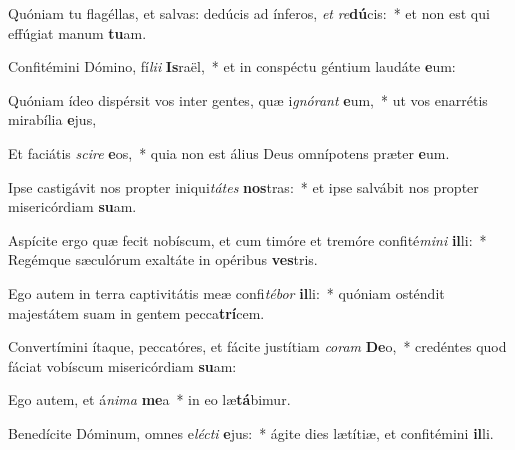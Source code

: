 \item Quóniam tu flagéllas, et salvas: dedúcis ad ínferos, \textit{et} \textit{re}\textbf{dú}cis:~* et non est qui effúgiat manum \textbf{tu}am.
\item Confitémini Dómino, fí\textit{li}\textit{i} \textbf{Is}raël,~* et in conspéctu géntium laudáte \textbf{e}um:
\item Quóniam ídeo dispérsit vos inter gentes, quæ i\textit{gnó}\textit{rant} \textbf{e}um,~* ut vos enarrétis mirabília \textbf{e}jus,
\item Et faciátis \textit{sci}\textit{re} \textbf{e}os,~* quia non est álius Deus omnípotens præter \textbf{e}um.
\item Ipse castigávit nos propter iniqui\textit{tá}\textit{tes} \textbf{nos}tras:~* et ipse salvábit nos propter misericórdiam \textbf{su}am.
\item Aspícite ergo quæ fecit nobíscum, et cum timóre et tremóre confité\textit{mi}\textit{ni} \textbf{il}li:~* Regémque sæculórum exaltáte in opéribus \textbf{ves}tris.
\item Ego autem in terra captivitátis meæ confi\textit{té}\textit{bor} \textbf{il}li:~* quóniam osténdit majestátem suam in gentem pecca\textbf{trí}cem.
\item Convertímini ítaque, peccatóres, et fácite justítiam \textit{co}\textit{ram} \textbf{De}o,~* credéntes quod fáciat vobíscum misericórdiam \textbf{su}am:
\item Ego autem, et á\textit{ni}\textit{ma} \textbf{me}a~* in eo læ\textbf{tá}bimur.
\item Benedícite Dóminum, omnes e\textit{léc}\textit{ti} \textbf{e}jus:~* ágite dies lætítiæ, et confitémini \textbf{il}li.
